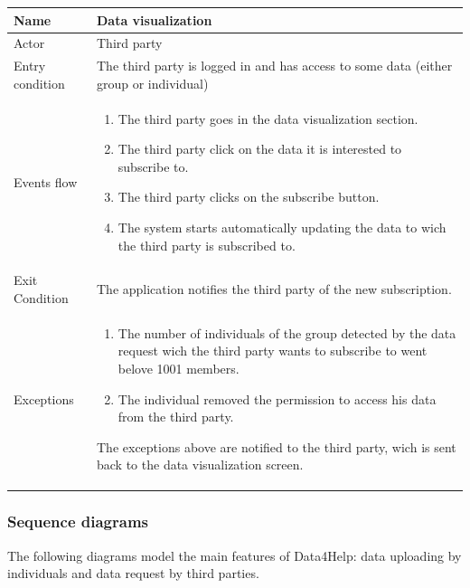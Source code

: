    
\begin{tabular}{|l|p{11cm}|}
    \hline
    Name & Data visualization
    \\ \hline
    Actor & Third party
    \\ \hline 
    Entry condition & The third party is logged in and has access to some data (either group or individual)
        \\ \hline
    Events flow &
    \begin{enumerate}
    \item The third party goes in the data visualization section.
    \item The third party click on the data it is interested to subscribe to.
	\item The third party clicks on the subscribe button.
	\item The system starts automatically updating the data to wich the third party is subscribed to.
    \end{enumerate}
     \\ \hline
     Exit Condition & The application notifies the third party of the new subscription.
     \\
    \hline
    Exceptions &
        \begin{enumerate}
    \item The number of individuals of the group detected by the data request wich the third party wants to subscribe to went belove 1001 members.
    \item The individual removed the permission to access his data from the third party.
\end{enumerate}  
 The exceptions above are notified to the third party, wich is sent back to the data visualization screen.
     
  \\
    \hline
\end{tabular}







\subsubsection{Sequence diagrams}
The following diagrams model the main features of Data4Help: data uploading by individuals and data request by third parties.


